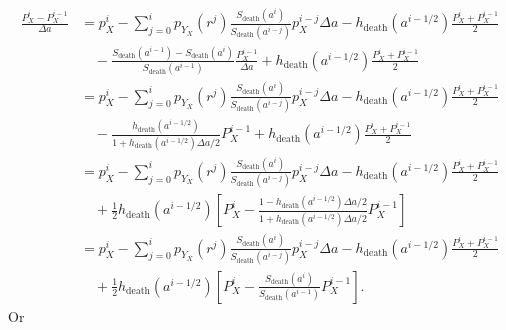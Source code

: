 \documentclass[12pt]{article}
\begin{document}
\begin{equation}
  \begin{split}
    \frac{P_X^i - P_X^{i - 1}}{\Delta a}
    &= p_X^i
    - \sum_{j = 0}^i p_{Y_X}(r^j)
    \frac{S_{\text{death}}(a^i)}{S_{\text{death}}(a^{i - j})}
    p_X^{i - j} \Delta a
    - h_{\text{death}}(a^{i - 1 / 2})
    \frac{P_X^i + P_X^{i - 1}}{2}
    \\ & \quad {}
    - \frac{S_{\text{death}}(a^{i - 1}) - S_{\text{death}}(a^i)}
    {S_{\text{death}}(a^{i - 1})}
    \frac{P_X^{i - 1}}{\Delta a}
    + h_{\text{death}}(a^{i - 1 / 2})
    \frac{P_X^i + P_X^{i - 1}}{2}
    \\
    &= p_X^i
    - \sum_{j = 0}^i p_{Y_X}(r^j)
    \frac{S_{\text{death}}(a^i)}{S_{\text{death}}(a^{i - j})}
    p_X^{i - j} \Delta a
    - h_{\text{death}}(a^{i - 1 / 2})
    \frac{P_X^i + P_X^{i - 1}}{2}
    \\ & \quad {}
    - \frac{h_{\text{death}}(a^{i - 1 / 2})}
    {1 + h_{\text{death}}(a^{i - 1 / 2}) \Delta a / 2}
    P_X^{i - 1}
    + h_{\text{death}}(a^{i - 1 / 2})
    \frac{P_X^i + P_X^{i - 1}}{2}
    \\
    &= p_X^i
    - \sum_{j = 0}^i p_{Y_X}(r^j)
    \frac{S_{\text{death}}(a^i)}{S_{\text{death}}(a^{i - j})}
    p_X^{i - j} \Delta a
    - h_{\text{death}}(a^{i - 1 / 2})
    \frac{P_X^i + P_X^{i - 1}}{2}
    \\ & \quad {}
    + \frac{1}{2} h_{\text{death}}(a^{i - 1 / 2})
    \left[
      P_X^i
      - \frac{1 - h_{\text{death}}(a^{i - 1 / 2}) \Delta a / 2}
      {1 + h_{\text{death}}(a^{i - 1 / 2}) \Delta a / 2}
      P_X^{i - 1}
    \right]
    \\
    &= p_X^i
    - \sum_{j = 0}^i p_{Y_X}(r^j)
    \frac{S_{\text{death}}(a^i)}{S_{\text{death}}(a^{i - j})}
    p_X^{i - j} \Delta a
    - h_{\text{death}}(a^{i - 1 / 2})
    \frac{P_X^i + P_X^{i - 1}}{2}
    \\ & \quad {}
    + \frac{1}{2} h_{\text{death}}(a^{i - 1 / 2})
    \left[
      P_X^i
      - \frac{S_{\text{death}}(a^i)}{S_{\text{death}}(a^{i - 1})}
        P_X^{i - 1}
    \right].
  \end{split}
\end{equation}
Or
\end{document}
